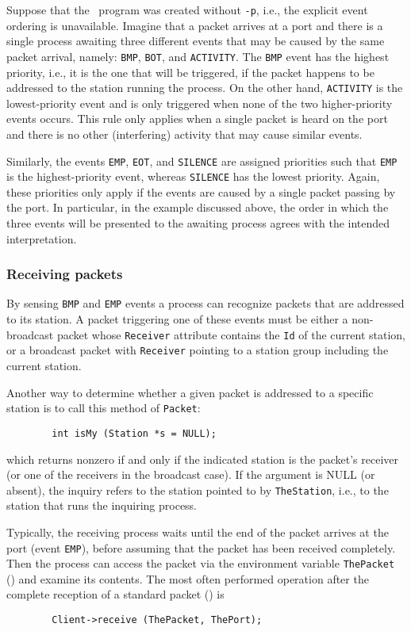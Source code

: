 Suppose that the \smurph\ program was created without
{\tt -p}, i.e., the explicit event ordering is unavailable.
Imagine that a packet arrives at a port and there is
a single process awaiting three different events that may be caused by the
same packet arrival, namely: {\tt BMP}, {\tt BOT}, and {\tt ACTIVITY}.
The {\tt BMP} event has the highest priority, i.e.,
it is the one that will be triggered, if the packet happens to be
addressed to the station running the process.
On the other hand, {\tt ACTIVITY} is the lowest-priority event and is only
triggered when none of the two higher-priority events occurs.
This rule only applies when a single packet is heard on the port and there is no
other (interfering) activity that may cause similar events.

Similarly, the events {\tt EMP}, {\tt EOT}, and {\tt SILENCE} are
assigned priorities such that {\tt EMP} is the highest-priority
event, whereas {\tt SILENCE} has the lowest priority.
Again, these priorities only apply if the events are caused by a single
packet passing by the port.
In particular, in the example discussed above, the order in which the
three events will be presented to the awaiting process agrees with the
intended interpretation.

\subsubsection{Receiving packets}
\label{rm_po_wr_rp}

By sensing {\tt BMP} and {\tt EMP} events a process can recognize packets
that are addressed to its station.
A packet triggering one of these events must be either a non-broadcast
packet whose {\tt Receiver} attribute contains the {\tt Id} of the
current station, or a broadcast packet with {\tt Receiver} pointing to
a station group including the current station.

Another way to determine whether a given
packet is addressed to a specific station
is to call this method of {\tt Packet}:
\begin{verbatim}
        int isMy (Station *s = NULL);
\end{verbatim}
which returns nonzero if and only if the indicated station is the packet's
receiver (or one of the receivers in the broadcast case).
If the argument is NULL (or absent), the inquiry refers to the station
pointed to by {\tt TheStation}, i.e., to the station that runs the inquiring
process.

Typically, the receiving process waits until the end of the packet arrives
at the port (event {\tt EMP}), before assuming that the packet has been
received completely.
Then the process can access the packet via the environment variable
{\tt ThePacket} () and examine its contents.
The most often performed operation after the complete reception of a 
standard packet () is
\begin{verbatim}
        Client->receive (ThePacket, ThePort);
\end{verbatim}

